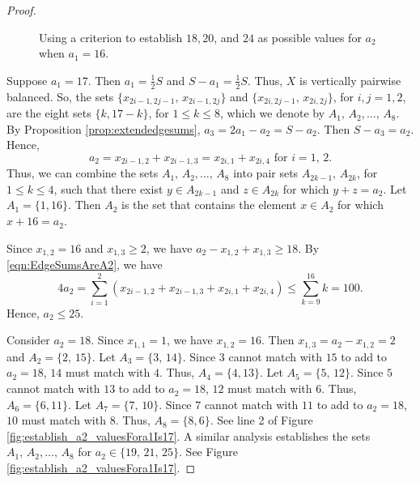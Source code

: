 \documentclass[10pt,a4paper]{amsart}
\begin{document}
\begin{proof}
\begin{figure}[hbt!]
    \caption{Using a criterion to establish $18, 20$, and $24$ as possible values for $a_2$ when $a_1=16$.}
    \label{establish_a2_valuesais16}
\end{figure}
  
  Suppose $a_1=17$. 
  Then $a_1=\tfrac{1}{2}S$ and $S-a_1=\tfrac{1}{2}S$.
  Thus, $X$ is vertically pairwise balanced.
  So, the sets
   $\{ x_{2i-1,2j-1},\, x_{2i-1,2j}\}$ and $\{ x_{2i,2j-1},\, x_{2i,2j}\}$,
 for $i,j=1,2$, are the eight sets $\{k,17-k\}$, for $1\le k \le 8$,
 which we denote by $A_1, \, A_2,\ldots,\, A_8$.
 By Proposition \ref{prop:extendedgesums}, $a_3=2a_1-a_2=S-a_2$. Then $S-a_3=a_2$.
 Hence,
   \begin{equation}\label{eqn:EdgeSumsAreA2}
      a_2=x_{2i-1,2}+x_{2i-1,3}=x_{2i,1}+x_{2i,4}
      \text{ \ for \ }i=1,\, 2.
  \end{equation}
 Thus, we can combine the sets $A_1, \, A_2,\ldots,\, A_8$ into pair sets
 $A_{2k-1},\, A_{2k}$, for $1\le k \le 4$, such that
there exist $y\in A_{2k-1}$ and $z\in A_{2k}$
  for which $y+z=a_2$.
  Let $A_1=\{ 1,16\}$.
  Then $A_2$ is the set that contains the element 
  $x\in A_2$ for which $x+16=a_2$.

Since $x_{1,2}=16$ and $x_{1,3}\ge 2$, we have
$a_2-x_{1,2}+x_{1,3}\ge 18$.
  By \eqref{eqn:EdgeSumsAreA2}, we have
  \begin{equation*}
      4a_2= \sum_{i=1}^2 (x_{2i-1,2}+x_{2i-1,3} +x_{2i,1}+x_{2i,4})
 \le \sum_{k=9}^{16} k =100.
  \end{equation*}
 Hence, $a_2\le 25$.

 Consider $a_2=18$. 
 Since $x_{1,1}=1$, we have $x_{1,2}=16$.
 Then $x_{1,3}=a_2-x_{1,2}=2$ and $A_2=\{2,\, 15\}$.
 Let $A_3=\{3,\, 14\}$. Since $3$ cannot match with $15$ to add to $a_2=18$,
 $14$ must match with $4$. Thus, $A_4=\{4, 13\}$.
 Let $A_5=\{5,\, 12\}$. Since $5$ cannot match with $13$ to add to $a_2=18$,
 $12$ must match with $6$. Thus, $A_6=\{6, 11\}$.
 Let $A_7=\{7,\, 10\}$. Since $7$ cannot match with $11$ to add to $a_2=18$,
 $10$ must match with $8$. Thus, $A_8=\{8, 6\}$.
 See line 2 of Figure \ref{fig:establish_a2_valuesFora1Is17}.
 A similar analysis establishes the sets $A_1,\, A_2,\ldots,\, A_8$
 for $a_2\in\{19,\, 21, \, 25\}$. See Figure \ref{fig:establish_a2_valuesFora1Is17}.
 

\end{proof}
\end{document}
